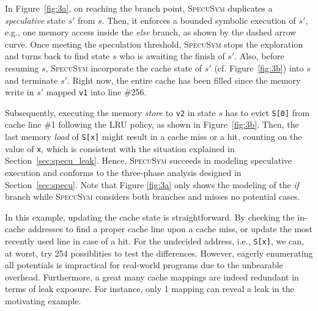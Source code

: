 \documentclass[sigconf]{acmart}
\newcommand\ignore[1]{}
\newcommand{\SpecuSym}{\textsc{SpecuSym} }
\begin{document}
In Figure~\ref{fig:3a}, on reaching the branch point, \SpecuSym duplicates a 
\textit{speculative} state $s'$ from $s$. Then, it enforces a bounded symbolic 
execution of $s'$, e.g., one memory access inside the \textit{else} branch, as 
shown by the dashed arrow curve. Once meeting the speculation threshold, 
\SpecuSym stops the exploration and turns back to find state $s$ who is awaiting 
the finish of $s'$. Also, before resuming $s$, \SpecuSym incorporate the cache 
state of $s'$ (cf. Figure~\ref{fig:3b}) into $s$ and terminate $s'$. Right now, 
the entire cache has been filled since the memory write in $s'$ mapped \texttt{v1} 
into line \#256. 


Subsequently, executing the memory \emph{store} to \texttt{v2} in state $s$ has
to evict \texttt{S[0]} from cache line \#1 following the LRU policy, as shown in 
Figure~\ref{fig:3b}. Then, the last memory \emph{load} of \texttt{S[x]} might 
result in a cache miss or a hit, counting on the value of \texttt{x}, which is 
consistent with the situation explained in Section~\ref{sec:specu_leak}. Hence, 
\SpecuSym succeeds in modeling speculative execution and conforms to the 
three-phase analysis designed in Section~\ref{sec:specu}. Note that Figure
\ref{fig:3a} only shows the modeling of the \emph{if} branch while \SpecuSym 
considers both branches and misses no potential cases. 


\ignore{
In Figure~\ref{fig:3a}, the speculative state $s'$ inherits the cache 
state from $s$, maps \texttt{v2} into a cache line, and merges back the updated 
cache state to state $s$ before its termination, as formally stated in Algorithm
\ref{alg:specusym} (lines 24-26). 
}


In this example, updating the cache state is straightforward. By checking the 
in-cache addresses to find a proper cache line upon a cache miss, or update the 
most recently used line in case of a hit. For the undecided address, i.e., 
\texttt{S[x]}, we can, at worst, try 254 possiblities to test the differences. 
However, eagerly enumerating all potentials is impractical for real-world programs 
due to the unbearable overhead. Furthermore, a great many cache mappings are
indeed redundant in terms of leak exposure. For instance, only 1 mapping can 
reveal a leak in the motivating example. 


\end{document}
